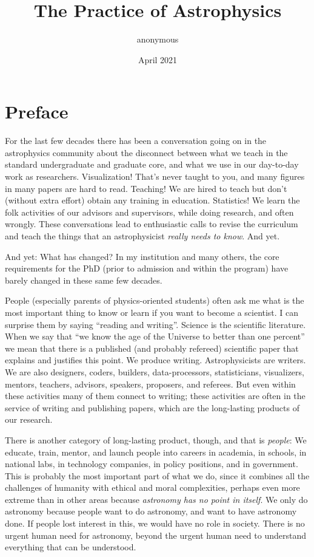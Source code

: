 \documentclass[12pt,letterpaper]{book}
\title{\textbf{The Practice of Astrophysics}}
\author{anonymous}
\date{April 2021}
\begin{document}
\maketitle

\cleardoublepage
\tableofcontents

\chapter*{Preface}

For the last few decades there has been a conversation going on in the astrophysics community about the disconnect between what we teach in the standard undergraduate and graduate core, and what we use in our day-to-day work as researchers.
Visualization! That's never taught to you, and many figures in many papers are hard to read.
Teaching! We are hired to teach but don't (without extra effort) obtain any training in education.
Statistics! We learn the folk activities of our advisors and supervisors, while doing research, and often wrongly.
These conversations lead to enthusiastic calls to revise the curriculum and teach the things that an astrophysicist \emph{really needs to know}. And yet.

And yet: What has changed? In my institution and many others, the core requirements for the PhD (prior to admission and within the program) have barely changed in these same few decades.

People (especially parents of physics-oriented students) often ask me what is the most important thing to know or learn if you want to become a scientist.
I can surprise them by saying ``reading and writing''.
Science is the scientific literature.
When we say that ``we know the age of the Universe to better than one percent'' we mean that there is a published (and probably refereed) scientific paper that explains and justifies this point.
We produce writing.
Astrophysicists are writers.
We are also designers, coders, builders, data-processors, statisticians, visualizers, mentors, teachers, advisors, speakers, proposers, and referees.
But even within these activities many of them connect to writing; these activities are often in the service of writing and publishing papers, which are the long-lasting products of our research.

There is another category of long-lasting product, though, and that is \emph{people}:
We educate, train, mentor, and launch people into careers in academia, in schools, in national labs, in technology companies, in policy positions, and in government.
This is probably the most important part of what we do, since it combines all the challenges of humanity with ethical and moral complexities, perhaps even more extreme than in other areas because \emph{astronomy has no point in itself}.
We only do astronomy because people want to do astronomy, and want to have astronomy done.
If people lost interest in this, we would have no role in society.
There is no urgent human need for astronomy, beyond the urgent human need to understand everything that can be understood.
\end{document}
